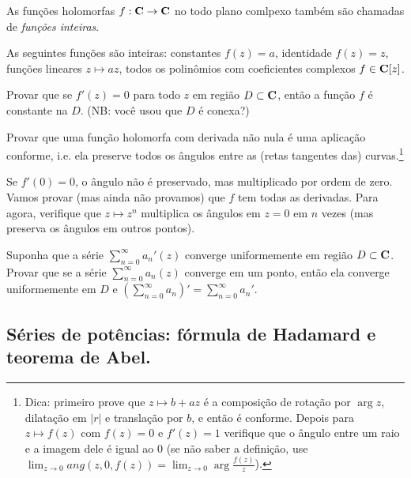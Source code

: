 \begin{defin}
\label{d:inteira}
As funções holomorfas $f: \mathbf{C} \to \mathbf{C}$ no todo plano comlpexo
também são chamadas de \emph{funções inteiras}.
\end{defin}

\begin{exem}
As seguintes funções são inteiras:
constantes $f(z) = a$,
identidade $f(z) = z$,
funções lineares $z \mapsto a z$,
todos os polinômios com coeficientes complexos $f \in \mathbf{C}[z]$.
\end{exem}

\begin{problema}
\label{p:derzero-constante}
Provar que se $f'(z)=0$ para todo $z$ em região $D\subset \mathbf{C}$, então a função $f$ é constante na $D$.
(NB: você usou que $D$ é conexa?)
\end{problema}

\begin{problema}
Provar que uma função holomorfa com derivada não nula é uma aplicação conforme,
i.e. ela preserve todos os ângulos entre as (retas tangentes das) curvas.\footnote{Dica:
primeiro prove que $z \mapsto b+ a z$ é a composição de rotação por $\arg z$, dilatação em $|r|$
e translação por $b$, e então é conforme.
Depois para $z \mapsto f(z)$ com $f(z) = 0$ e $f'(z)=1$ verifique que o ângulo entre um raio e a imagem dele
é igual ao $0$ (se não saber a definição, use $\lim_{z\to 0} ang(z,0,f(z)) = \lim_{z\to 0} \arg \frac{f(z)}{z}$).
}
\end{problema}

Se $f'(0)=0$, o ângulo não é preservado, mas multiplicado por ordem de zero. Vamos provar (mas ainda não provamos) que $f$ tem todas as derivadas. Para agora, verifique que $z\mapsto z^n$ multiplica os ângulos em $z=0$ em $n$ vezes
(mas preserva os ângulos em outros pontos).


\begin{problema}
\label{pre-weierstrass}
Suponha que a série $\sum_{n=0}^\infty a_n'(z)$ converge uniformemente em região $D\subset \mathbf{C}$.
Provar que se a série $\sum_{n=0}^\infty a_n(z)$ converge em um ponto,
então ela converge uniformemente em $D$ e $(\sum_{n=0}^\infty a_n)' = \sum_{n=0}^\infty a_n'$.
\end{problema}


\subsection{Séries de potências: fórmula de Hadamard e teorema de Abel.}

